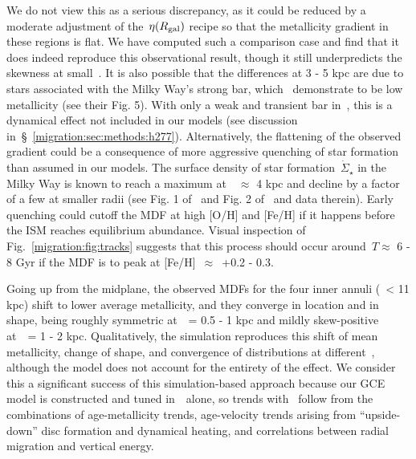 We do not view this as a serious discrepancy, as it could be reduced by a
moderate adjustment of the~$\eta(R_\text{gal})$ recipe so that the metallicity 
gradient in these regions is flat. 
We have computed such a comparison case and find that it does indeed reproduce 
this observational result, though it still underpredicts the skewness at 
small~\rgal. 
It is also possible that the differences at 3 - 5 kpc are due to stars 
associated with the Milky Way's strong bar, which~\citet{Bovy2019} demonstrate 
to be low metallicity (see their Fig. 5). 
With only a weak and transient bar in~\hsim, this is a dynamical effect not 
included in our models (see discussion in~\S~\ref{migration:sec:methods:h277}). 
Alternatively, the flattening of the observed gradient could be a consequence 
of more aggressive quenching of star formation than assumed in our models. 
The surface density of star formation~$\dot{\Sigma}_\star$ in the Milky Way 
is known to reach a maximum at~\rgal~$\approx$ 4 kpc and decline by a factor 
of a few at smaller radii (see Fig. 1 of~\citealp{Peek2009} and Fig. 2 
of~\citealp{Fraternali2012} and data therein). 
Early quenching could cutoff the MDF at high [O/H] and [Fe/H] if it happens 
before the ISM reaches equilibrium abundance. 
Visual inspection of Fig.~\ref{migration:fig:tracks} suggests that this process should 
occur around~$T \approx$ 6 - 8 Gyr if the MDF is to peak at 
[Fe/H]~$\approx$~+0.2 - 0.3. 
\par 
Going up from the midplane, the observed MDFs for the four inner annuli 
(\rgal~< 11 kpc) shift to lower average metallicity, and they converge in 
location and in shape, being roughly symmetric at~\absz~= 0.5 - 1 kpc and 
mildly skew-positive at~\absz~= 1 - 2 kpc. 
Qualitatively, the simulation reproduces this shift of mean metallicity, change 
of shape, and convergence of distributions at different~\rgal, although the 
model does not account for the entirety of the effect. 
We consider this a significant success of this simulation-based approach 
because our GCE model is constructed and tuned in~\rgal~alone, so trends with 
\absz~follow from the combinations of age-metallicity trends, age-velocity 
trends arising from ``upside-down'' disc formation and dynamical heating, and 
correlations between radial migration and vertical energy. 
